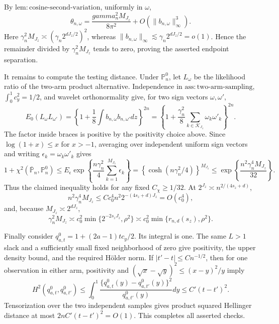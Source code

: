 By \(\mathrm{lem{:}cosine\text{-}second\text{-}variation}\), uniformly in \(\omega\),
\[
 \theta_{n,\omega}
 =\frac{gamma_n^2M_{J_z}}{8\pi^2}
   +O(\|b_{n,\omega}\|_\infty^3).
\]
Here \(\gamma_n^2M_{J_z}\asymp(\gamma_n2^{dJ_z/2})^2\), whereas \(\|b_{n,\omega}\|_\infty\lesssim\gamma_n2^{dJ_z/2}=o(1)\).  Hence the remainder divided by \(\gamma_n^2M_{J_z}\) tends to zero, proving the asserted endpoint separation.

It remains to compute the testing distance.  Under \(\mathbb P_n^0\), let \(L_\omega\) be the likelihood ratio of the two-arm product alternative.  Independence in \(\mathrm{ass{:}two\text{-}arm\text{-}sampling}\), \(\int_0^1c_y^2=1/2\), and wavelet orthonormality give, for two sign vectors \(\omega,\omega'\),
\[
 E_0(L_\omega L_{\omega'})
 =\left\{1+\frac18\int b_{n,\omega}b_{n,\omega'}dz\right\}^{2n}
 =\left\{1+\frac{\gamma_n^2}{8}
             \sum_{k\in\mathcal K_{J_z}}\omega_k\omega'_k\right\}^{2n}.
\]
The factor inside braces is positive by the positivity choice above.  Since \(\log(1+x)\le x\) for \(x>-1\), averaging over independent uniform sign vectors and writing \(\epsilon_k=\omega_k\omega'_k\) gives
\[
 1+\chi^2(\overline{\mathbb P}_n,\mathbb P_n^0)
 \le E_\epsilon\exp\left\{\frac{n\gamma_n^2}{4}
                     \sum_{k=1}^{M_{J_z}}\epsilon_k\right\}
 =\left\{\cosh(n\gamma_n^2/4)\right\}^{M_{J_z}}
 \le \exp\left\{\frac{n^2\gamma_n^4M_{J_z}}{32}\right\}.
\]
Thus the claimed inequality holds for any fixed \(C_\chi\ge1/32\).  At \(2^{J_z}\asymp n^{2/(4s_z+d)}\),
\[
 n^2\gamma_n^4M_{J_z}
 \le Cc_0^4n^2 2^{-(4s_z+d)J_z}=O(c_0^4),
\]
and, because \(M_{J_z}\asymp2^{dJ_z}\),
\[
 \gamma_n^2M_{J_z}
 \asymp c_0^2\min\{2^{-2s_zJ_z},\rho^2\}
 \asymp c_0^2\min\{r_{n,d}(s_z),\rho^2\}.
\]

Finally consider \(q_{a,t}^0=1+(2a-1)tc_y/2\).  Its integral is one.  The same \(L>1\) slack and a sufficiently small fixed neighborhood of zero give positivity, the upper density bound, and the required H\"older norm.  If \(|t'-t|\le Cn^{-1/2}\), then for one observation in either arm, positivity and \((\sqrt x-\sqrt y)^2\le(x-y)^2/y\) imply
\[
 H^2(q_{a,t}^0,q_{a,t'}^0)
 \le \int_0^1\frac{\{q_{a,t}^0(y)-q_{a,t'}^0(y)\}^2}{q_{a,t'}^0(y)}dy
 \le C'(t-t')^2.
\]
Tensorization over the two independent samples gives product squared Hellinger distance at most \(2nC'(t-t')^2=O(1)\).  This completes all asserted checks.